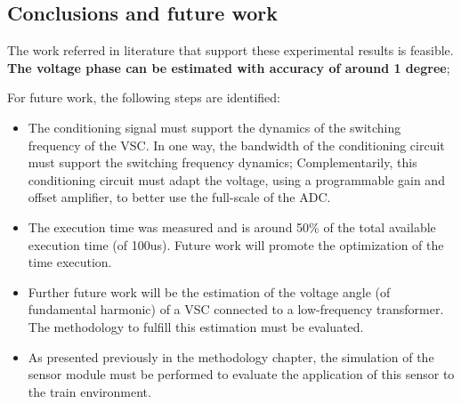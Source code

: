 \subsection{Conclusions and future work}
	The work referred in literature that support these experimental results is feasible. \textbf{The voltage phase can be estimated with accuracy of around 1 degree};
	
	For future work, the following steps are identified:
	
	\begin{itemize}
		\setlength\itemsep{0em}
	
		\item The conditioning signal must support the dynamics of the switching frequency of the VSC. In one way, the bandwidth of the conditioning circuit must support the switching frequency dynamics; Complementarily, this conditioning circuit must adapt the voltage, using a programmable gain and offset amplifier, to better use the full-scale of the ADC.
		
		\item The execution time was measured and is around 50\% of the total available execution time (of 100us). Future work will promote the optimization of the time execution.
		
		
		\item Further future work will be the estimation of the voltage angle (of fundamental harmonic) of a VSC connected to a low-frequency transformer. The methodology to fulfill this estimation must be evaluated.
		
		\item As presented previously in the methodology chapter, the simulation of the sensor module must be performed to evaluate the application of this sensor to the train environment.
	\end{itemize}
